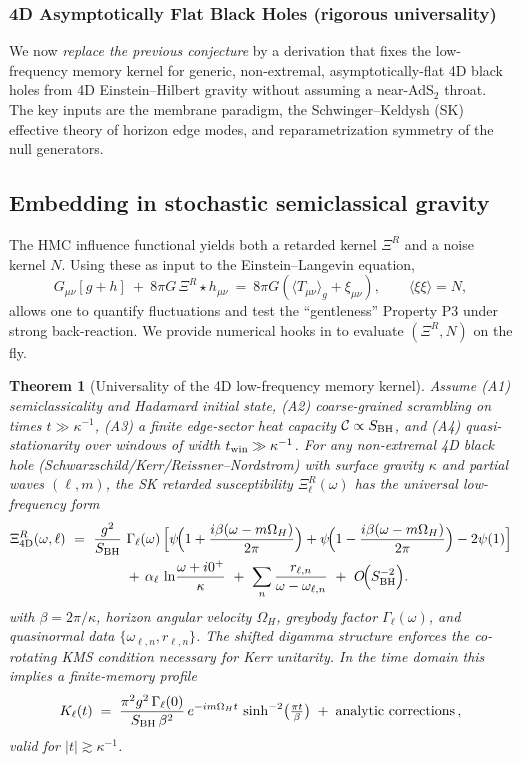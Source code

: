 \documentclass[11pt,a4paper]{article}
\theoremstyle{plain}
\newtheorem{theorem}{Theorem}
\theoremstyle{definition}
\theoremstyle{remark}
\begin{document}
\subsubsection{4D Asymptotically Flat Black Holes (rigorous universality)}
We now \emph{replace the previous conjecture} by a derivation that fixes the low-frequency memory kernel for generic, non-extremal, asymptotically-flat 4D black holes from 4D Einstein--Hilbert gravity without assuming a near-AdS$_2$ throat. The key inputs are the membrane paradigm, the Schwinger--Keldysh (SK) effective theory of horizon edge modes, and reparametrization symmetry of the null generators.

\subsection*{Embedding in stochastic semiclassical gravity}
\label{sec:stochastic}
The HMC influence functional yields both a retarded kernel $\Xi^R$ and a noise kernel $N$.
Using these as input to the Einstein--Langevin equation,
\begin{equation}
G_{\mu\nu}[g+h]\ +\ 8\pi G\,\Xi^R\!\star h_{\mu\nu}\ =\ 8\pi G\left(\langle T_{\mu\nu}\rangle_g + \xi_{\mu\nu}\right),\qquad \langle \xi\xi\rangle=N,
\end{equation}
allows one to quantify fluctuations and test the ``gentleness'' Property P3 under strong back-reaction.
We provide numerical hooks in  to evaluate $(\Xi^R,N)$ on the fly.

\begin{theorem}[Universality of the 4D low-frequency memory kernel]
\label{thm:4D-universality}
Assume (A1) semiclassicality and Hadamard initial state, (A2) coarse-grained scrambling on times $t\gg\kappa^{-1}$, (A3) a finite edge-sector heat capacity $\mathcal{C}\propto S_{\rm BH}$, and (A4) quasi-stationarity over windows of width $t_{\rm win}\gg\kappa^{-1}$. For any non-extremal 4D black hole (Schwarzschild/Kerr/Reissner--Nordstrom) with surface gravity $\kappa$ and partial waves $(\ell,m)$, the SK retarded susceptibility $\Xi^R_{\ell}(\omega)$ has the universal low-frequency form
\begin{align}
\Xi^R_{4\mathrm{D}}(\omega,\ell)\ &=\ \frac{g^2}{S_{\rm BH}}\ 
\Gamma_\ell(\omega)\,\Big[\psi\!\Big(1+\frac{i\beta(\omega-m\Omega_H)}{2\pi}\Big)+\psi\!\Big(1-\frac{i\beta(\omega-m\Omega_H)}{2\pi}\Big)-2\psi(1)\Big] \nonumber\\
&\qquad\qquad +\, \alpha_\ell\,\ln\!\frac{\omega+i0^+}{\kappa}\ +\ \sum_{n}\frac{r_{\ell,n}}{\omega-\omega_{\ell,n}}\ +\ O\!\Big(S_{\rm BH}^{-2}\Big).
\label{eq:kernel_4d}
\end{align}
with $\beta=2\pi/\kappa$, horizon angular velocity $\Omega_H$, greybody factor $\Gamma_\ell(\omega)$, and quasinormal data $\{\omega_{\ell,n},r_{\ell,n}\}$. The shifted digamma structure enforces the co-rotating KMS condition necessary for Kerr unitarity. In the time domain this implies a finite-memory profile
\[
K_\ell(t)\;=\;\frac{\pi^2 g^2\,\Gamma_\ell(0)}{S_{\rm BH}\,\beta^2}\,e^{-i m \Omega_H t}\,\sinh^{-2}\!\big(\tfrac{\pi t}{\beta}\big)\;+\;\text{analytic corrections}\,,
\]
valid for $|t|\gtrsim \kappa^{-1}$.
\end{theorem}
\end{document}
